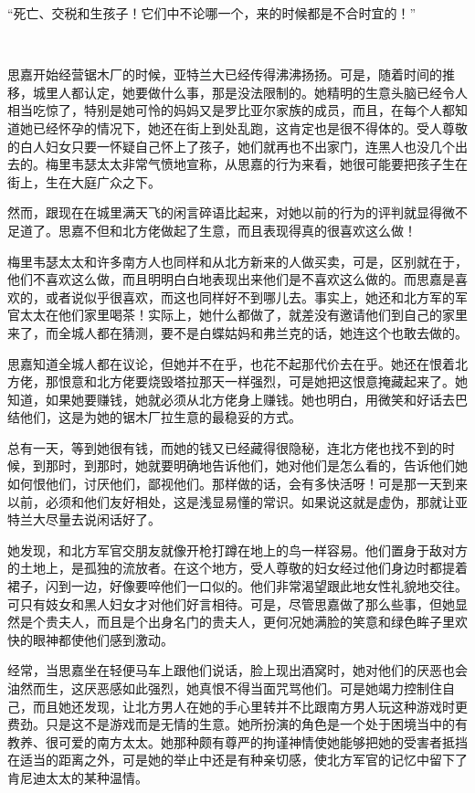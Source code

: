 \par “死亡、交税和生孩子！它们中不论哪一个，来的时候都是不合时宜的！”
\par  
\par 思嘉开始经营锯木厂的时候，亚特兰大已经传得沸沸扬扬。可是，随着时间的推移，城里人都认定，她要做什么事，那是没法限制的。她精明的生意头脑已经令人相当吃惊了，特别是她可怜的妈妈又是罗比亚尔家族的成员，而且，在每个人都知道她已经怀孕的情况下，她还在街上到处乱跑，这肯定也是很不得体的。受人尊敬的白人妇女只要一怀疑自己怀上了孩子，她们就再也不出家门，连黑人也没几个出去的。梅里韦瑟太太非常气愤地宣称，从思嘉的行为来看，她很可能要把孩子生在街上，生在大庭广众之下。
\par 然而，跟现在在城里满天飞的闲言碎语比起来，对她以前的行为的评判就显得微不足道了。思嘉不但和北方佬做起了生意，而且表现得真的很喜欢这么做！
\par 梅里韦瑟太太和许多南方人也同样和从北方新来的人做买卖，可是，区别就在于，他们不喜欢这么做，而且明明白白地表现出来他们是不喜欢这么做的。而思嘉是喜欢的，或者说似乎很喜欢，而这也同样好不到哪儿去。事实上，她还和北方军的军官太太在他们家里喝茶！实际上，她什么都做了，就差没有邀请他们到自己的家里来了，而全城人都在猜测，要不是白蝶姑妈和弗兰克的话，她连这个也敢去做的。
\par 思嘉知道全城人都在议论，但她并不在乎，也花不起那代价去在乎。她还在恨着北方佬，那恨意和北方佬要烧毁塔拉那天一样强烈，可是她把这恨意掩藏起来了。她知道，如果她要赚钱，她就必须从北方佬身上赚钱。她也明白，用微笑和好话去巴结他们，这是为她的锯木厂拉生意的最稳妥的方式。
\par 总有一天，等到她很有钱，而她的钱又已经藏得很隐秘，连北方佬也找不到的时候，到那时，到那时，她就要明确地告诉他们，她对他们是怎么看的，告诉他们她如何恨他们，讨厌他们，鄙视他们。那样做的话，会有多快活呀！可是那一天到来以前，必须和他们友好相处，这是浅显易懂的常识。如果说这就是虚伪，那就让亚特兰大尽量去说闲话好了。
\par 她发现，和北方军官交朋友就像开枪打蹲在地上的鸟一样容易。他们置身于敌对方的土地上，是孤独的流放者。在这个地方，受人尊敬的妇女经过他们身边时都提着裙子，闪到一边，好像要啐他们一口似的。他们非常渴望跟此地女性礼貌地交往。可只有妓女和黑人妇女才对他们好言相待。可是，尽管思嘉做了那么些事，但她显然是个贵夫人，而且是个出身名门的贵夫人，更何况她满脸的笑意和绿色眸子里欢快的眼神都使他们感到激动。
\par 经常，当思嘉坐在轻便马车上跟他们说话，脸上现出酒窝时，她对他们的厌恶也会油然而生，这厌恶感如此强烈，她真恨不得当面咒骂他们。可是她竭力控制住自己，而且她还发现，让北方男人在她的手心里转并不比跟南方男人玩这种游戏时更费劲。只是这不是游戏而是无情的生意。她所扮演的角色是一个处于困境当中的有教养、很可爱的南方太太。她那种颇有尊严的拘谨神情使她能够把她的受害者抵挡在适当的距离之外，可是她的举止中还是有种亲切感，使北方军官的记忆中留下了肯尼迪太太的某种温情。
